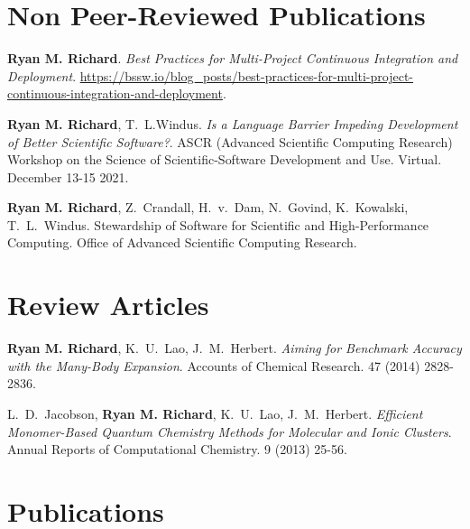 \section{Non Peer-Reviewed Publications}
\begin{etaremune}
	\item{\textbf{Ryan M. Richard}. 
          \emph{Best Practices for Multi-Project Continuous Integration 
	   	        and Deployment}.
         \url{https://bssw.io/blog_posts/best-practices-for-multi-project-continuous-integration-and-deployment}.}
	\item{\textbf{Ryan M. Richard}, T.~L.Windus. \emph{Is a Language Barrier
		Impeding Development of Better Scientific Software?}. ASCR (Advanced
		Scientific Computing Research) Workshop on the Science of
		Scientific-Software Development and Use. Virtual. December 13-15 2021.}
	\item{\textbf{Ryan M. Richard}, Z.~Crandall, H.~v.~Dam, N.~Govind,
		K.~Kowalski, T.~L.~Windus. Stewardship of Software for Scientific and
		High-Performance Computing. Office of Advanced Scientific Computing
		Research.}
\end{etaremune}

\section{Review Articles}
\vspace{5pt}
\begin{etaremune}
	\item{\textbf{Ryan M. Richard}, K.~U.~Lao, J.~M.~Herbert.  {\em Aiming for 
	      Benchmark Accuracy with the Many-Body Expansion}.  Accounts of 
		  Chemical Research.  47 (2014) 2828-2836.}
	\item{L.~D.~Jacobson, \textbf{Ryan M. Richard}, K.~U.~Lao, J.~M.~Herbert.  
	      {\em Efficient Monomer-Based Quantum Chemistry Methods for Molecular 
		  and Ionic Clusters}.  Annual Reports of Computational Chemistry.  
		  9 (2013) 25-56.}
\end{etaremune}

\section{Publications}

